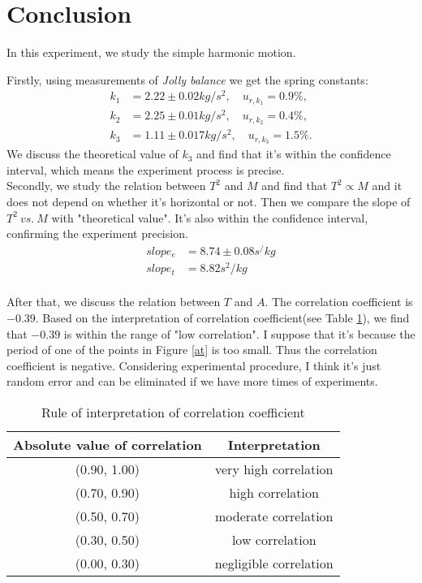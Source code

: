 \section{Conclusion}
    In this experiment, we study the simple harmonic motion.
    
    Firstly, using measurements of \emph{Jolly balance} we get the spring constants:
    \[
    \begin{split}
        k_1&= 2.22\pm 0.02 kg/s^2,\quad u_{r,k_1}=0.9\%,\\
        k_2&= 2.25\pm 0.01 kg/s^2,\quad u_{r,k_2}=0.4\%,\\
        k_3&= 1.11\pm 0.017kg/s^2,\quad u_{r,k_3}=1.5\%.
    \end{split}
    \]
    We discuss the theoretical value of $k_3$ and find that it's within the confidence interval, which means the experiment process is precise.\\

    Secondly, we study the relation between $T^2$ and $M$ and find that $T^2\propto M$ and it does not depend on whether it's horizontal or not. Then we compare the slope of $T^2\ vs.\ M$ with "theoretical value". It's also within the confidence interval, confirming the experiment precision.
    \[
    \begin{split}
        slope_e&=8.74\pm 0.08s^/kg\\
        slope_t&=8.82s^2/kg\\
    \end{split}
    \]

    After that, we discuss the relation between $T$ and $A$. The correlation coefficient is $-0.39$. Based on the interpretation of correlation coefficient(see Table \ref{rule}), we find that $-0.39$ is within the range of "low correlation". I suppose that it's because the period of one of the points in Figure \ref{at} is too small. Thus the correlation coefficient is negative. Considering experimental procedure, I think it's just random error and can be eliminated if we have more times of experiments.
    \begin{table}
        \centering
        \begin{tabular}{|c|c|}
            \hline \hline
            \textbf{Absolute value of correlation} & \textbf{Interpretation} \\\hline
            (0.90, 1.00) & very high correlation\\\hline
            (0.70, 0.90) & high correlation\\\hline
            (0.50, 0.70) & moderate correlation\\\hline
            (0.30, 0.50) & low correlation\\\hline
            (0.00, 0.30) & negligible correlation\\\hline\hline
        \end{tabular}
        \caption{Rule of interpretation of correlation coefficient \cite{foo1}}\label{rule}
    \end{table}\\


